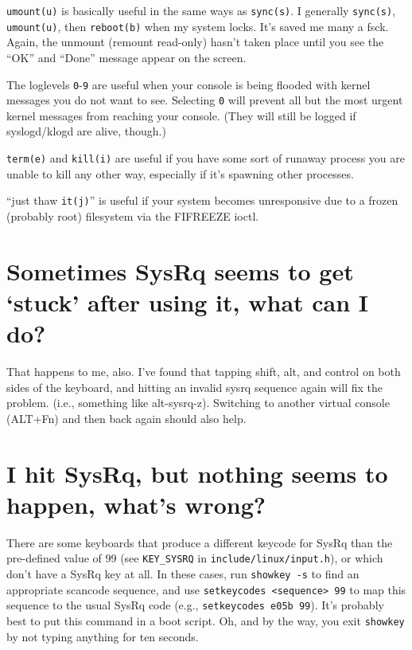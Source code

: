 \documentclass[article,letterpaper]{memoir}
\let\subsection\section
\let\section\chapter
\begin{document}
\texttt{umount(u)} is basically useful in the same ways as
\texttt{sync(s)}. I generally \texttt{sync(s)}, \texttt{umount(u)}, then
\texttt{reboot(b)} when my system locks. It's saved me many a fsck.
Again, the unmount (remount read-only) hasn't taken place until you see
the ``OK'' and ``Done'' message appear on the screen.

The loglevels \texttt{0}-\texttt{9} are useful when your console is
being flooded with kernel messages you do not want to see. Selecting
\texttt{0} will prevent all but the most urgent kernel messages from
reaching your console. (They will still be logged if syslogd/klogd are
alive, though.)

\texttt{term(e)} and \texttt{kill(i)} are useful if you have some sort
of runaway process you are unable to kill any other way, especially if
it's spawning other processes.

``just thaw \texttt{it(j)}'' is useful if your system becomes
unresponsive due to a frozen (probably root) filesystem via the FIFREEZE
ioctl.

\iffalse
\subsection{\texorpdfstring{Sometimes SysRq seems to get `stuck' after
using it, what can I
do?}{Sometimes SysRq seems to get stuck after using it, what can I do?}}\label{sometimes-sysrq-seems-to-get-stuck-after-using-it-what-can-i-do}

That happens to me, also. I've found that tapping shift, alt, and
control on both sides of the keyboard, and hitting an invalid sysrq
sequence again will fix the problem. (i.e., something like alt-sysrq-z).
Switching to another virtual console (ALT+Fn) and then back again should
also help.

\subsection{I hit SysRq, but nothing seems to happen, what's
wrong?}\label{i-hit-sysrq-but-nothing-seems-to-happen-whats-wrong}

There are some keyboards that produce a different keycode for SysRq than
the pre-defined value of 99 (see \texttt{KEY\_SYSRQ} in
\texttt{include/linux/input.h}), or which don't have a SysRq key at all.
In these cases, run \texttt{showkey\ -s} to find an appropriate scancode
sequence, and use
\texttt{setkeycodes\ \textless{}sequence\textgreater{}\ 99} to map this
sequence to the usual SysRq code (e.g., \texttt{setkeycodes\ e05b\ 99}).
It's probably best to put this command in a boot script. Oh, and by the
way, you exit \texttt{showkey} by not typing anything for ten seconds.
\end{document}
